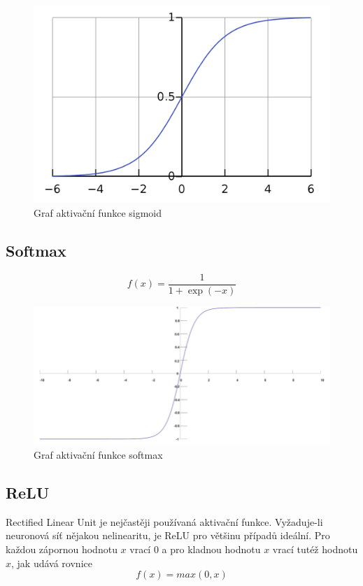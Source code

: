 \begin{figure}[H]
    \centering
    \includegraphics[scale=0.18]{obrazky-figures/sigmoid.png}
    \caption{\label{fig:sigmoid}Graf aktivační funkce sigmoid}
\end{figure}



\subsection*{Softmax}
\begin{equation}
  f(x) = \frac{1}{1+\exp(-x)}
\end{equation}


\begin{figure}[H]
    \centering
    \includegraphics[scale=0.35]{obrazky-figures/softmax.png}
    \caption{\label{fig:softmax}Graf aktivační funkce softmax}
\end{figure}




\subsection*{ReLU}
\label{relu}
Rectified Linear Unit je nejčastěji používaná aktivační funkce. Vyžaduje-li neuronová síť nějakou nelinearitu, je ReLU pro většinu případů ideální. Pro každou zápornou hodnotu $x$ vrací $0$ a pro kladnou hodnotu $x$ vrací tutéž hodnotu $x$, jak udává rovnice 
\begin{equation}
   f(x)=max(0,x)
\end{equation}

